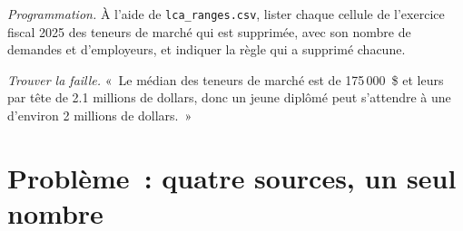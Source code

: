 \begin{exercise}[$\star\star\star$]\label{exo:in:pay-levels-by-role-firm-type-and-seniority:7}
\emph{Programmation.} À l'aide de \texttt{lca\_ranges.csv}, lister chaque cellule de l'exercice fiscal 2025 des teneurs de marché qui est supprimée, avec
son nombre de demandes et d'employeurs, et indiquer la règle qui a supprimé chacune.
\end{exercise}

\begin{exercise}[$\star\star\star$]\label{exo:in:pay-levels-by-role-firm-type-and-seniority:8}
\emph{Trouver la faille.} «~Le  médian des teneurs de marché est de 175\,000~\$ et leurs  par tête de 2.1 millions de dollars, donc un jeune diplômé
peut s'attendre à une  d'environ 2 millions de dollars.~»
\end{exercise}

\section{Problème~: quatre sources, un seul nombre}

